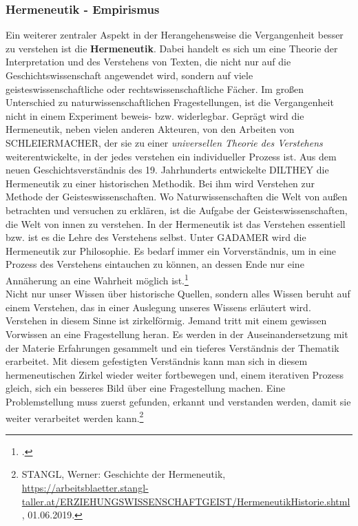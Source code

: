 \documentclass[12pt,a4paper]{article}
\begin{document}
\subsubsection{Hermeneutik - Empirismus}

Ein weiterer zentraler Aspekt in der Herangehensweise die Vergangenheit besser zu verstehen ist die \textbf{Hermeneutik}. Dabei handelt es sich um eine Theorie der Interpretation und des Verstehens von Texten, die nicht nur auf die Geschichtswissenschaft angewendet wird, sondern auf viele geisteswissenschaftliche oder rechtswissenschaftliche Fächer. Im großen Unterschied zu naturwissenschaftlichen Fragestellungen, ist die Vergangenheit nicht in einem Experiment beweis- bzw. widerlegbar. Geprägt wird die Hermeneutik, neben vielen anderen Akteuren, von den Arbeiten von SCHLEIERMACHER, der sie zu einer \textit{universellen Theorie des Verstehens} weiterentwickelte, in der jedes verstehen ein individueller Prozess ist. Aus dem neuen Geschichtsverständnis des 19. Jahrhunderts entwickelte DILTHEY die Hermeneutik zu einer historischen Methodik. Bei ihm wird Verstehen zur Methode der Geisteswissenschaften. Wo Naturwissenschaften die Welt von außen betrachten und versuchen zu erklären, ist die Aufgabe der Geisteswissenschaften, die Welt von innen zu verstehen. In der Hermeneutik ist das Verstehen essentiell bzw. ist es die Lehre des Verstehens selbst. Unter GADAMER wird die Hermeneutik zur Philosophie. Es bedarf immer ein Vorverständnis, um in eine Prozess des Verstehens eintauchen zu können, an dessen Ende nur eine Annäherung an eine Wahrheit möglich ist.\footcite[][S.19-30]{schulz2010neuere}
\\
Nicht nur unser Wissen über historische Quellen, sondern alles Wissen beruht auf einem Verstehen, das in einer Auslegung unseres Wissens erläutert wird. Verstehen in diesem Sinne ist zirkelförmig. Jemand tritt mit einem gewissen Vorwissen an eine Fragestellung heran. Es werden in der Auseinandersetzung mit der Materie Erfahrungen gesammelt und ein tieferes Verständnis der Thematik erarbeitet. Mit diesem gefestigten Verständnis kann man sich in diesem hermeneutischen Zirkel wieder weiter fortbewegen und, einem iterativen Prozess gleich, sich ein besseres Bild über eine Fragestellung machen. Eine Problemstellung muss zuerst gefunden, erkannt und verstanden werden, damit sie weiter verarbeitet werden kann.\footnote{STANGL, Werner: Geschichte der Hermeneutik, \protect\url{https://arbeitsblaetter.stangl-taller.at/ERZIEHUNGSWISSENSCHAFTGEIST/HermeneutikHistorie.shtml}, 01.06.2019.}
\end{document}
